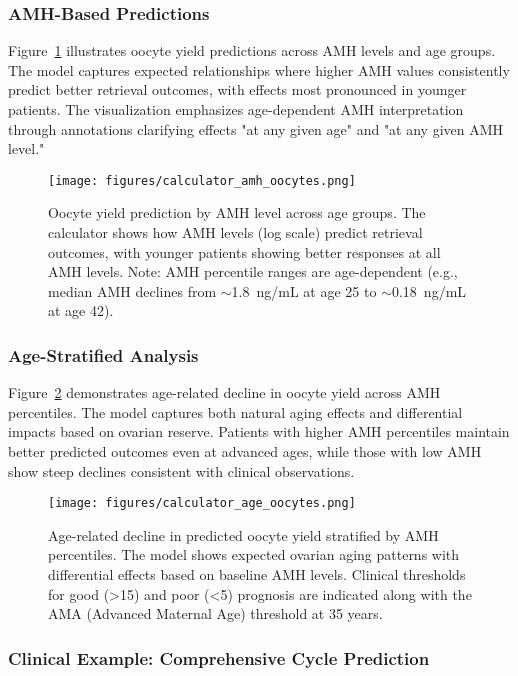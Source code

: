 \documentclass[pdflatex,sn-basic]{sn-jnl}%
\begin{document}
\subsubsection{AMH-Based Predictions}

Figure~\ref{fig:calculator_amh} illustrates oocyte yield predictions across AMH levels and age groups. The model captures expected relationships where higher AMH values consistently predict better retrieval outcomes, with effects most pronounced in younger patients. The visualization emphasizes age-dependent AMH interpretation through annotations clarifying effects "at any given age" and "at any given AMH level."

\begin{figure}[H]
    \centering
    \texttt{[image: figures/calculator\_amh\_oocytes.png]}
    \caption{Oocyte yield prediction by AMH level across age groups. The calculator shows how AMH levels (log scale) predict retrieval outcomes, with younger patients showing better responses at all AMH levels. Note: AMH percentile ranges are age-dependent (e.g., median AMH declines from $\sim$1.8~ng/mL at age 25 to $\sim$0.18~ng/mL at age 42).}
    \label{fig:calculator_amh}
\end{figure}

\subsubsection{Age-Stratified Analysis}

Figure~\ref{fig:calculator_age} demonstrates age-related decline in oocyte yield across AMH percentiles. The model captures both natural aging effects and differential impacts based on ovarian reserve. Patients with higher AMH percentiles maintain better predicted outcomes even at advanced ages, while those with low AMH show steep declines consistent with clinical observations.

\begin{figure}[H]
    \centering
    \texttt{[image: figures/calculator\_age\_oocytes.png]}
    \caption{Age-related decline in predicted oocyte yield stratified by AMH percentiles. The model shows expected ovarian aging patterns with differential effects based on baseline AMH levels. Clinical thresholds for good (>15) and poor (<5) prognosis are indicated along with the AMA (Advanced Maternal Age) threshold at 35 years.}
    \label{fig:calculator_age}
\end{figure}

\subsubsection{Clinical Example: Comprehensive Cycle Prediction}
\end{document}
